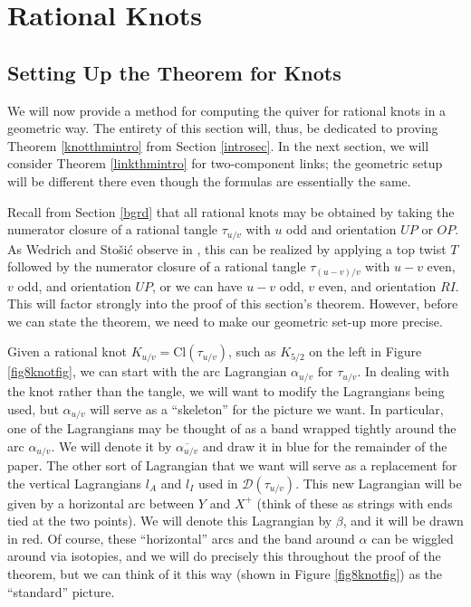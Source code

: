 \documentclass[11pt]{amsart}
\theoremstyle{plain}
\theoremstyle{definition}
\theoremstyle{remark}
\begin{document}
\section{Rational Knots}
\label{knotssec}

\subsection{Setting Up the Theorem for Knots}
\label{knotssetup}

We will now provide a method for computing the quiver for rational knots in a geometric way. The entirety of this section will, thus, be dedicated to proving Theorem \ref{knotthmintro} from Section \ref{introsec}. In the next section, we will consider Theorem \ref{linkthmintro} for two-component links; the geometric setup will be different there even though the formulas are essentially the same.

Recall from Section \ref{bgrd} that all rational knots may be obtained by taking the numerator closure of a rational tangle $\tau_{u/v}$ with $u$ odd and orientation $UP$ or $OP$. As Wedrich and Sto\v si\'c observe in \cite{SW21}, this can be realized by applying a top twist $T$ followed by the numerator closure of a rational tangle $\tau_{(u-v)/v}$ with $u-v$ even, $v$ odd, and orientation $UP$, or we can have $u-v$ odd, $v$ even, and orientation $RI$. This will factor strongly into the proof of this section's theorem. However, before we can state the theorem, we need to make our geometric set-up more precise.


Given a rational knot $K_{u/v}=\text{Cl}(\tau_{u/v})$, such as $K_{5/2}$ on the left in Figure \ref{fig8knotfig}, we can start with the arc Lagrangian $\alpha_{u/v}$ for $\tau_{u/v}$. In dealing with the knot rather than the tangle, we will want to modify the Lagrangians being used, but $\alpha_{u/v}$ will serve as a ``skeleton'' for the picture we want. In particular, one of the Lagrangians may be thought of as a band wrapped tightly around the arc $\alpha_{u/v}$. We will denote it by $\overline{\alpha_{u/v}}$ and draw it in blue for the remainder of the paper. The other sort of Lagrangian that we want will serve as a replacement for the vertical Lagrangians $l_A$ and $l_I$ used in $\mathcal{D}(\tau_{u/v})$. This new Lagrangian will be given by a horizontal arc between $Y$ and $X^+$ (think of these as strings with ends tied at the two points). We will denote this Lagrangian by $\beta$, and it will be drawn in red. Of course, these ``horizontal'' arcs and the band around $\alpha$ can be wiggled around via isotopies, and we will do precisely this throughout the proof of the theorem, but we can think of it this way (shown in Figure \ref{fig8knotfig}) as the ``standard'' picture.
\end{document}
